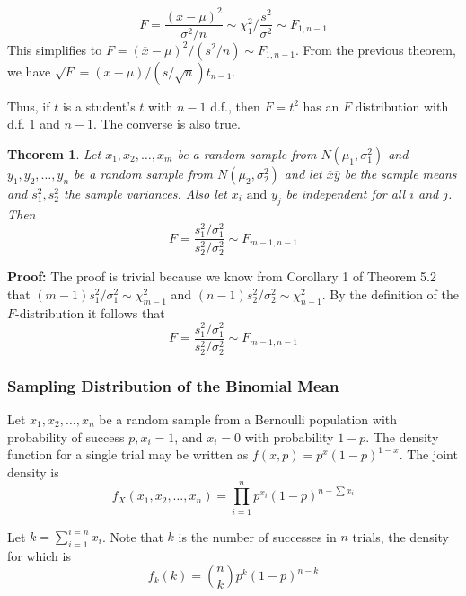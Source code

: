 \documentclass{article}
\newtheorem{theorem}{Theorem}[section]
\begin{document}
\begin{equation*}
    F=\frac{(\overline{x}-\mu)^2}{\sigma^2/n}\sim\chi_1^2 / \frac{s^2}{\sigma^2} \sim F_{1,n-1}
\end{equation*}
This simplifies to \(F=(\overline{x}-\mu)^2/(s^2/n)\sim F_{1,n-1}\). From the previous theorem, we have \(\sqrt{F}=(x-\mu)/(s/\sqrt{n})t_{n-1}\). 

Thus, if $t$ is a student's $t$ with $n-1$ d.f., then $F=t^2$ has an $F$ distribution with d.f. $1$ and $n-1$. The converse is also true.

\begin{theorem}
    Let \(x_1,x_2,\dots,x_m\) be a random sample from \(N(\mu_1,\sigma_1^2)\) and \(y_1,y_2,\dots,y_n\) be a random sample from \(N(\mu_2,\sigma_2^2)\) and let \(\overline{x} \overline{y}\) be the sample means and \(s_1^2,s_2^2\) the sample variances. Also let \(x_i \text{ and } y_j\) be independent for all $i$ and $j$. Then
    \begin{equation*}
        F=\frac{s_1^2/\sigma_1^2}{s_2^2/\sigma_2^2}\sim F_{m-1,n-1}
    \end{equation*}
\end{theorem}

\textbf{Proof:} The proof is trivial because we know from Corollary 1 of Theorem 5.2 that \((m-1)s_1^2/\sigma_1^2\sim\chi_{m-1}^2\) and \((n-1)s_2^2/\sigma_2^2\sim\chi_{n-1}^2\). By the definition of the \(F\)-distribution it follows that
\begin{equation*}
    F=\frac{s_1^2/\sigma_1^2}{s_2^2/\sigma_2^2}\sim F_{m-1,n-1}
\end{equation*}

\subsubsection{Sampling Distribution of the Binomial Mean}

Let \(x_1,x_2,\dots,x_n\) be a random sample from a Bernoulli population with probability of success $p,x_i=1$, and $x_i=0$ with probability $1-p$. The density function for a single trial may be written as \(f(x,p)=p^x(1-p)^{1-x}\). The joint density is
\begin{equation*}
    f_X(x_1,x_2,\dots,x_n)=\prod_{i=1}^n p^{x_i}(1-p)^{n-\sum x_i}
\end{equation*}

Let \(k=\sum_{i=1}^{i=n} x_i\). Note that $k$ is the number of successes in $n$ trials, the density for which is
\begin{equation*}
    f_k(k)=\binom{n}{k} p^k(1-p)^{n-k}
\end{equation*}
\end{document}
